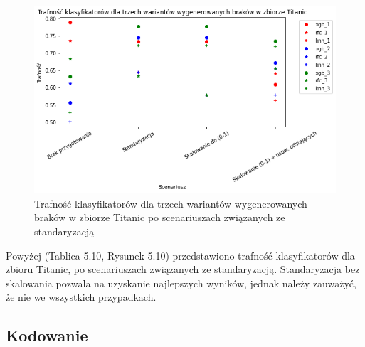 \documentclass{book}
\begin{document}
\begin{figure}[H]
    \centerline{\includegraphics[scale=0.8]{Titanic_Standaryzacja}}
    \centering
    \caption{Trafność klasyfikatorów dla trzech wariantów wygenerowanych braków w zbiorze Titanic po scenariuszach związanych ze standaryzacją}
    \end{figure}


Powyżej (Tablica 5.10, Rysunek 5.10) przedstawiono 
trafność klasyfikatorów dla zbioru Titanic, 
po scenariuszach związanych ze standaryzacją.
Standaryzacja bez skalowania pozwala na uzyskanie 
najlepszych wyników, jednak należy zauważyć, że nie
we wszystkich przypadkach.

\subsection{Kodowanie}
\end{document}
